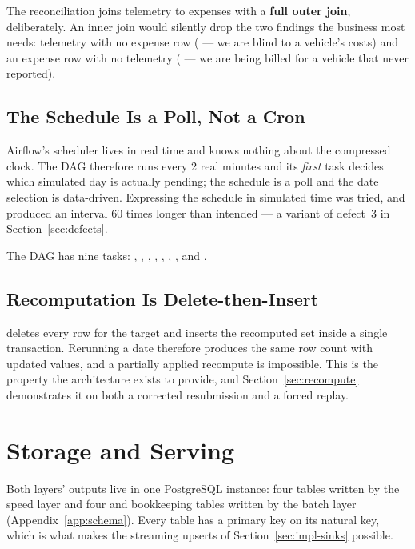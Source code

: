 The reconciliation joins telemetry to expenses with a \textbf{full outer
join}, deliberately. An inner join would silently drop the two findings
the business most needs: telemetry with no expense row
( --- we are blind to a vehicle's costs) and an
expense row with no telemetry ( --- we are being
billed for a vehicle that never reported).

\subsection{The Schedule Is a Poll, Not a Cron}

Airflow's scheduler lives in real time and knows nothing about the
compressed clock. The DAG therefore runs every 2 real minutes and its
\emph{first} task decides which simulated day is actually pending;
the schedule is a poll and the date selection is data-driven. Expressing
the schedule in simulated time was tried, and produced an interval 60
times longer than intended --- a variant of defect~3 in
Section~\ref{sec:defects}.

The DAG has nine tasks: ,
, ,
, ,
, ,
 and .

\subsection{Recomputation Is Delete-then-Insert}

 deletes every row for the target
 and inserts the recomputed set inside a single
transaction. Rerunning a date therefore produces the same row count with
updated values, and a partially applied recompute is impossible. This is
the property the architecture exists to provide, and
Section~\ref{sec:recompute} demonstrates it on both a corrected
resubmission and a forced replay.

\section{Storage and Serving}
\label{sec:impl-serving}

Both layers' outputs live in one PostgreSQL instance: four 
tables written by the speed layer and four  and
bookkeeping tables written by the batch layer
(Appendix~\ref{app:schema}). Every  table has a primary key
on its natural key, which is what makes the streaming upserts of
Section~\ref{sec:impl-sinks} possible.

